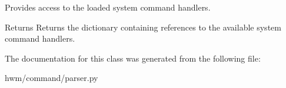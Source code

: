 Provides access to the loaded system command handlers. 

\begin{DoxyReturn}{Returns}
Returns the dictionary containing references to the available system command handlers. 
\end{DoxyReturn}


The documentation for this class was generated from the following file\-:\begin{DoxyCompactItemize}
\item 
hwm/command/parser.\-py\end{DoxyCompactItemize}
